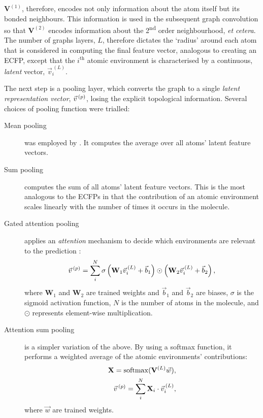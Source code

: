 $\mathbf{V}^{(1)}$, therefore, encodes not only information about the atom itself but its bonded neighbours. This information is used in the subsequent graph convolution so that $\mathbf{V}^{(2)}$ encodes information about the
2\textsuperscript{nd} order neighbourhood, \emph{et cetera}. The number of graphs layers, $L$, therefore dictates the `radius' around each atom that is considered in computing the final feature vector, analogous to creating an ECFP, except that the $i^\text{th}$ atomic environment is characterised by a continuous, \emph{latent} vector, $\vec{v}^{\,(L)}_i$.

The next step is a pooling layer, which converts the graph to a single \emph{latent representation vector}, $\vec{v}^{\,(p)}{}$, losing the explicit topological information. Several choices of pooling function were trialled:

\begin{description}
    \item[Mean pooling] was employed by \citet{qinPredictingCriticalMicelle2021}. It computes the average
          over all atoms' latent feature vectors.
    \item[Sum pooling] computes the sum of all atoms' latent feature vectors.
          This is the most analogous to the ECFPs in that the contribution of an atomic environment scales linearly with the number of times it occurs
          in the molecule.
    \item[Gated attention pooling] applies an \emph{attention} mechanism to decide which environments
          are relevant to the prediction \cite{liGatedGraphSequence2017}:
          \begin{equation}
              \vec{v}^{\,(p)}{} = \sum_i^N \sigma\left(\mathbf{W}_1 \vec{v}_i^{\,(L)} + \vec{b}_1 \right) \odot \left(\mathbf{W}_2 \vec{v}_i^{\,(L)} + \vec{b}_2 \right),
          \end{equation}
          where $\mathbf{W}_1$ and $\mathbf{W}_2$ are trained weights and
          $\vec{b}_1$ and $\vec{b}_2$ are biases, $\sigma$ is the sigmoid
          activation function, $N$ is the number of atoms in the molecule, and
          $\odot$ represents element-wise multiplication.
    \item[Attention sum pooling] is a simpler variation of the above. By using a
          softmax function, it performs a weighted average of the atomic environments'
          contributions:
          \begin{align}
              \mathbf{X} = \mathrm{softmax}(\mathbf{V}^{(L)}\vec{w}), \\
              \vec{v}^{\,(p)}{} = \sum_i^N \mathbf{X}_i \cdot \vec{v}^{\,(L)}_i,
          \end{align}
          where $\vec{w}$ are trained weights.
\end{description}

